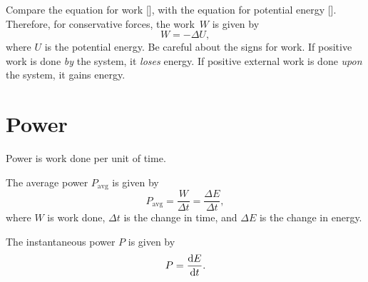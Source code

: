 Compare the equation for work [],
with the equation for potential energy [].
Therefore, for conservative forces, the work~\(W\) is given by
\begin{equation}
    W = - \Delta{U},
\end{equation}
where \(U\) is the potential energy.
Be careful about the signs for work.
If positive work is done \emph{by} the system, it \emph{loses} energy.
If positive external work is done \emph{upon} the system, it gains energy.

\section{Power}

Power is work done per unit of time.

The average power \(P_\mathrm{avg}\) is given by
\begin{equation}
    P_\mathrm{avg} = \frac{W}{\Delta{t}} = \frac{\Delta{E}}{\Delta{t}},
\end{equation}
where \(W\) is work done, \(\Delta{t}\) is the change in time,
and \(\Delta{E}\) is the change in energy.

The instantaneous power \(P\) is given by
\begin{equation}
    P = \odv{E}{t}.
\end{equation}
